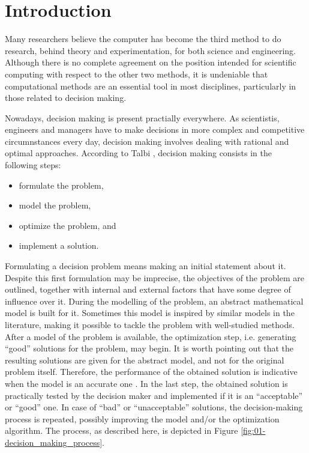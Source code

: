 
\chapter{Introduction}


\noindent Many researchers believe the computer has become the third
method to do research, behind theory and experimentation, for both
science and engineering. Although there is no complete agreement on
the position intended for scientific computing with respect to the
other two methods, it is undeniable that computational methods are
an essential tool in most disciplines, particularly in those related
to decision making.

Nowadays, decision making is present practially everywhere. As scientistis,
engineers and managers have to make decisions in more complex and
competitive circumnstances every day, decision making involves dealing
with rational and optimal approaches. According to Talbi \cite{Talbi_Metaheuristics:2009},
decision making consists in the following steps:
\begin{itemize}
\item formulate the problem,
\item model the problem, 
\item optimize the problem, and
\item implement a solution.
\end{itemize}
Formulating a decision problem means making an initial statement about
it. Despite this first formulation may be imprecise, the objectives
of the problem are outlined, together with internal and external factors
that have some degree of influence over it. During the modelling of
the problem, an abstract mathematical model is built for it. Sometimes
this model is inspired by similar models in the literature, making
it possible to tackle the problem with well-studied methods. After
a model of the problem is available, the optimization step, i.e. generating
``good'' solutions for the problem, may begin. It is worth pointing
out that the resulting solutions are given for the abstract model,
and not for the original problem itself. Therefore, the performance
of the obtained solution is indicative when the model is an accurate
one \cite{Talbi_Metaheuristics:2009}. In the last step, the obtained
solution is practically tested by the decision maker and implemented
if it is an ``acceptable'' or ``good'' one. In case of ``bad''
or ``unacceptable'' solutions, the decision-making process is repeated,
possibly improving the model and/or the optimization algorithm. The
process, as described here, is depicted in Figure \ref{fig:01-decision_making_process}.

